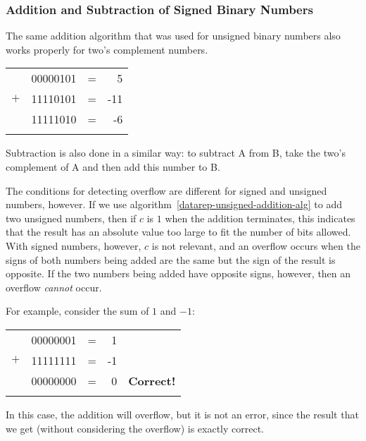 \subsubsection{Addition and Subtraction of Signed Binary Numbers}

The same addition algorithm that was used for unsigned binary numbers
also works properly for two's complement numbers.

\begin{tabular}{llcr}
        \\
        &       00000101        & = & 5         \\
  $+$   &       11110101        & = & -11       \\
\hline
        &       11111010        & = & -6        \\
        \\
\end{tabular}

Subtraction is also done in a similar way: to subtract A from B, take
the two's complement of A and then add this number to B.

The conditions for detecting overflow are different for signed
and unsigned numbers, however.  If we use
algorithm~\ref{datarep-unsigned-addition-alg} to add two unsigned numbers,
then if $c$ is $1$ when the addition terminates,
this indicates that the result has an absolute value
too large to fit the number of bits allowed.
With signed numbers, however, $c$ is not relevant, and an overflow
occurs when the signs of both numbers being added are the same
but the sign of the result is opposite.  If the two numbers being added have
opposite signs, however, then an overflow {\em cannot} occur.

For example, consider the sum of $1$ and $-1$:

\begin{tabular}{llcrl}
        \\
        &       00000001        & = & 1         & \\
  $+$   &       11111111        & = & -1        & \\
\hline
        &       00000000        & = & 0         & {\bf Correct!}        \\
        \\
\end{tabular}

In this case, the addition will overflow, but it is not
an error, since the result that we get (without considering
the overflow) is exactly correct.

